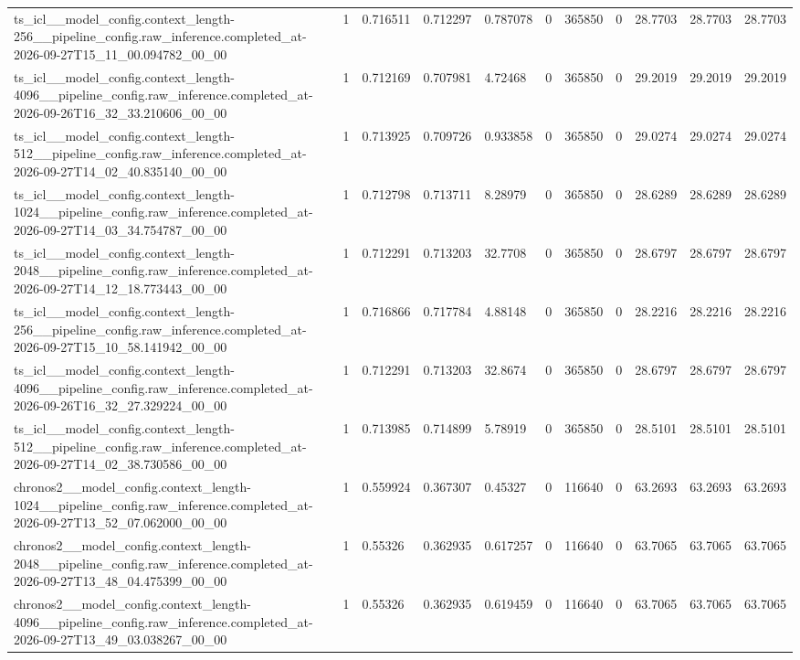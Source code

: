 \begin{tabular}{lllllllllll}
ts\_icl\_\_model\_config.context\_length-256\_\_pipeline\_config.raw\_inference.completed\_at-2026-09-27T15\_11\_00.094782\_00\_00 & 1 & 0.716511 & 0.712297 & 0.787078 & 0 & 365850 & 0 & 28.7703 & 28.7703 & 28.7703 \\
ts\_icl\_\_model\_config.context\_length-4096\_\_pipeline\_config.raw\_inference.completed\_at-2026-09-26T16\_32\_33.210606\_00\_00 & 1 & 0.712169 & 0.707981 & 4.72468 & 0 & 365850 & 0 & 29.2019 & 29.2019 & 29.2019 \\
ts\_icl\_\_model\_config.context\_length-512\_\_pipeline\_config.raw\_inference.completed\_at-2026-09-27T14\_02\_40.835140\_00\_00 & 1 & 0.713925 & 0.709726 & 0.933858 & 0 & 365850 & 0 & 29.0274 & 29.0274 & 29.0274 \\
ts\_icl\_\_model\_config.context\_length-1024\_\_pipeline\_config.raw\_inference.completed\_at-2026-09-27T14\_03\_34.754787\_00\_00 & 1 & 0.712798 & 0.713711 & 8.28979 & 0 & 365850 & 0 & 28.6289 & 28.6289 & 28.6289 \\
ts\_icl\_\_model\_config.context\_length-2048\_\_pipeline\_config.raw\_inference.completed\_at-2026-09-27T14\_12\_18.773443\_00\_00 & 1 & 0.712291 & 0.713203 & 32.7708 & 0 & 365850 & 0 & 28.6797 & 28.6797 & 28.6797 \\
ts\_icl\_\_model\_config.context\_length-256\_\_pipeline\_config.raw\_inference.completed\_at-2026-09-27T15\_10\_58.141942\_00\_00 & 1 & 0.716866 & 0.717784 & 4.88148 & 0 & 365850 & 0 & 28.2216 & 28.2216 & 28.2216 \\
ts\_icl\_\_model\_config.context\_length-4096\_\_pipeline\_config.raw\_inference.completed\_at-2026-09-26T16\_32\_27.329224\_00\_00 & 1 & 0.712291 & 0.713203 & 32.8674 & 0 & 365850 & 0 & 28.6797 & 28.6797 & 28.6797 \\
ts\_icl\_\_model\_config.context\_length-512\_\_pipeline\_config.raw\_inference.completed\_at-2026-09-27T14\_02\_38.730586\_00\_00 & 1 & 0.713985 & 0.714899 & 5.78919 & 0 & 365850 & 0 & 28.5101 & 28.5101 & 28.5101 \\
chronos2\_\_model\_config.context\_length-1024\_\_pipeline\_config.raw\_inference.completed\_at-2026-09-27T13\_52\_07.062000\_00\_00 & 1 & 0.559924 & 0.367307 & 0.45327 & 0 & 116640 & 0 & 63.2693 & 63.2693 & 63.2693 \\
chronos2\_\_model\_config.context\_length-2048\_\_pipeline\_config.raw\_inference.completed\_at-2026-09-27T13\_48\_04.475399\_00\_00 & 1 & 0.55326 & 0.362935 & 0.617257 & 0 & 116640 & 0 & 63.7065 & 63.7065 & 63.7065 \\
chronos2\_\_model\_config.context\_length-4096\_\_pipeline\_config.raw\_inference.completed\_at-2026-09-27T13\_49\_03.038267\_00\_00 & 1 & 0.55326 & 0.362935 & 0.619459 & 0 & 116640 & 0 & 63.7065 & 63.7065 & 63.7065 \\

\end{tabular}
